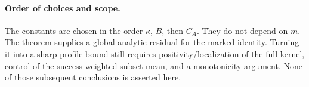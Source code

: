 \documentclass[11pt]{article}
\begin{document}
\paragraph{Order of choices and scope.}
The constants are chosen in the order $\kappa$, $B$, then $C_A$.
They do not depend on $m$. The theorem supplies a global analytic
residual for the marked identity. Turning it into a sharp profile
bound still requires positivity/localization of the full kernel,
control of the success-weighted subset mean, and a monotonicity
argument. None of those subsequent conclusions is asserted here.
\end{document}
